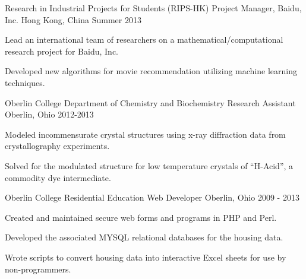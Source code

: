 \begin{cventries}

  \cventry
    {Research in Industrial Projects for Students (RIPS-HK)} %
    {Project Manager, Baidu, Inc.} %
    {Hong Kong, China} %
    {Summer 2013} %
    {
      \begin{cvitems} %
        \item {Lead an international team of researchers on a mathematical/computational research project for Baidu, Inc.}
        \item {Developed new algorithms for movie recommendation utilizing machine learning techniques.}
      \end{cvitems}
    }

  \cventry
    {Oberlin College Department of Chemistry and Biochemistry} %
    {Research Assistant} %
    {Oberlin, Ohio} %
    {2012-2013} %
    {
      \begin{cvitems} %
        \item {Modeled incommensurate crystal structures using x-ray diffraction data from crystallography experiments.}
        \item {Solved for the modulated structure for low temperature crystals of “H-Acid”, a commodity dye intermediate.}
      \end{cvitems}
    }

  \cventry
    {Oberlin College Residential Education} %
    {Web Developer} %
    {Oberlin, Ohio} %
    {2009 - 2013} %
    {
      \begin{cvitems} %
        \item {Created and maintained secure web forms and programs in PHP and Perl.}
        \item {Developed the associated MYSQL relational databases for the housing data.}
        \item {Wrote scripts to convert housing data into interactive Excel sheets for use by non-programmers.}
      \end{cvitems} 
    }


\end{cventries}
